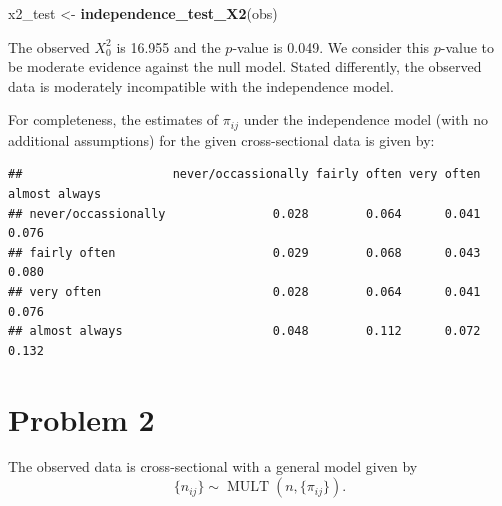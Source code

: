 \documentclass[
]{article}
\newenvironment{Shaded}{\begin{snugshade}}{\end{snugshade}}
\newcommand{\AttributeTok}[1]{\textcolor[rgb]{0.13,0.29,0.53}{#1}}
\newcommand{\DecValTok}[1]{\textcolor[rgb]{0.00,0.00,0.81}{#1}}
\newcommand{\FunctionTok}[1]{\textcolor[rgb]{0.13,0.29,0.53}{\textbf{#1}}}
\newcommand{\NormalTok}[1]{#1}
\newcommand{\OtherTok}[1]{\textcolor[rgb]{0.56,0.35,0.01}{#1}}
\newcommand{\SpecialCharTok}[1]{\textcolor[rgb]{0.81,0.36,0.00}{\textbf{#1}}}
\begin{document}
\begin{Shaded}
\begin{Highlighting}[]
\NormalTok{x2\_test }\OtherTok{\textless{}{-}} \FunctionTok{independence\_test\_X2}\NormalTok{(obs)}
\end{Highlighting}
\end{Shaded}

The observed \(X_0^2\) is 16.955 and the \(p\)-value is 0.049. We
consider this \(p\)-value to be moderate evidence against the null
model. Stated differently, the observed data is moderately incompatible
with the independence model.

For completeness, the estimates of \(\pi_{i j}\) under the independence
model (with no additional assumptions) for the given cross-sectional
data is given by:

\begin{Shaded}
\end{Shaded}

\begin{verbatim}
##                     never/occassionally fairly often very often almost always
## never/occassionally               0.028        0.064      0.041         0.076
## fairly often                      0.029        0.068      0.043         0.080
## very often                        0.028        0.064      0.041         0.076
## almost always                     0.048        0.112      0.072         0.132
\end{verbatim}

\hypertarget{problem-2}{%
\section{Problem 2}\label{problem-2}}


The observed data is cross-sectional with a general model given by \[
  \{n_{i j}\} \sim \operatorname{MULT}(n, \{\pi_{i j}\}).
\]
\end{document}
